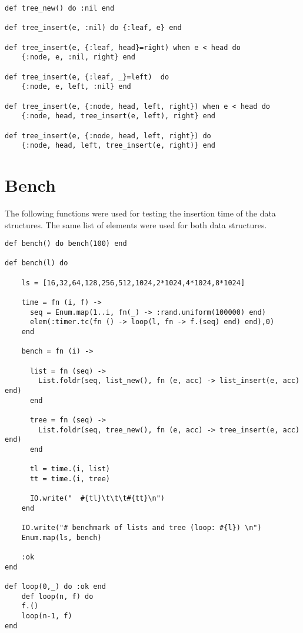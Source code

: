 \documentclass[a4paper,11pt]{article}
\begin{document}
\begin{verbatim}
def tree_new() do :nil end

def tree_insert(e, :nil) do {:leaf, e} end

def tree_insert(e, {:leaf, head}=right) when e < head do 
    {:node, e, :nil, right} end

def tree_insert(e, {:leaf, _}=left)  do 
    {:node, e, left, :nil} end
    
def tree_insert(e, {:node, head, left, right}) when e < head do 
    {:node, head, tree_insert(e, left), right} end
    
def tree_insert(e, {:node, head, left, right}) do
    {:node, head, left, tree_insert(e, right)} end
\end{verbatim}

\section{Bench}

The following functions were used for testing the insertion time of the data structures. The same list of elements were used for both data structures.

\begin{verbatim}
def bench() do bench(100) end

def bench(l) do

    ls = [16,32,64,128,256,512,1024,2*1024,4*1024,8*1024]
    
    time = fn (i, f) ->
      seq = Enum.map(1..i, fn(_) -> :rand.uniform(100000) end)
      elem(:timer.tc(fn () -> loop(l, fn -> f.(seq) end) end),0)
    end

    bench = fn (i) ->

      list = fn (seq) ->
        List.foldr(seq, list_new(), fn (e, acc) -> list_insert(e, acc) end)
      end
    
      tree = fn (seq) ->
        List.foldr(seq, tree_new(), fn (e, acc) -> tree_insert(e, acc) end)
      end
    
      tl = time.(i, list)
      tt = time.(i, tree)
    
      IO.write("  #{tl}\t\t\t#{tt}\n")
    end

    IO.write("# benchmark of lists and tree (loop: #{l}) \n")
    Enum.map(ls, bench)

    :ok
end

def loop(0,_) do :ok end
    def loop(n, f) do
    f.()
    loop(n-1, f)
end
\end{verbatim}
\end{document}
